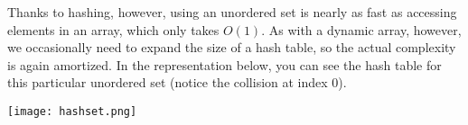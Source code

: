 Thanks to hashing, however, using an unordered set is nearly as fast as accessing elements in an array, which only takes $O(1)$. As with a dynamic array, however, we occasionally need to expand the size of a hash table, so the actual complexity is again amortized. In the representation below, you can see the hash table for this particular unordered set (notice the collision at index 0).

\texttt{[image: hashset.png]} 


